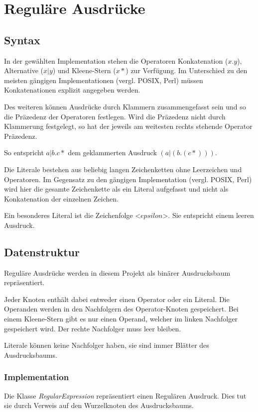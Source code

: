 \chapter{Reguläre Ausdrücke}

\section{Syntax}
In der gewählten Implementation stehen die Operatoren Konkatenation ($x.y$),
Alternative ($x|y$) und Kleene-Stern ($x*$) zur Verfügung. Im Unterschied zu den
meisten gängigen Implementationen (vergl. POSIX\cite{RegExPOSIX}, Perl\cite{RegExPERL}) müssen Konkatenationen
explizit angegeben werden.

Des weiteren können Ausdrücke durch Klammern zusammengefasst sein und so die
Präzedenz der Operatoren festlegen. Wird die Präzedenz nicht durch Klammerung
festgelegt, so hat der jeweils am weitesten rechts stehende Operator Präzedenz.

So entspricht $a|b.c*$ dem geklammerten Ausdruck $(a|(b.(c*)))$.

Die Literale bestehen aus beliebig langen Zeichenketten ohne Leerzeichen und
Operatoren. Im Gegensatz zu den gängigen Implementation (vergl. POSIX\cite{RegExPOSIX}, Perl\cite{RegExPERL}) wird
hier die gesamte Zeichenkette als ein Literal aufgefasst und nicht als Konkatenation
der einzelnen Zeichen.

Ein besonderes Literal ist die Zeichenfolge <$epsilon$>. Sie
entspricht einem leeren Ausdruck.

\section{Datenstruktur}
Reguläre Ausdrücke werden in diesem Projekt als binärer Ausdrucksbaum
repräsentiert.

Jeder Knoten enthält dabei entweder einen Operator oder ein Literal.
Die Operanden werden in den Nachfolgern des Operator-Knoten gespeichert. Bei
einem Kleene-Stern gibt es nur einen Operand, welcher im linken Nachfolger
gespeichert wird. Der rechte Nachfolger muss leer bleiben.

Literale können keine Nachfolger haben, sie sind immer Blätter des Ausdrucksbaums.

\subsection{Implementation}
Die Klasse \textit{RegularExpression} repräsentiert einen Regulären Ausdruck.
Dies tut sie durch Verweis auf den Wurzelknoten des Ausdrucksbaums.

